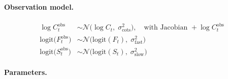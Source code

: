 \paragraph{Observation model.}
\begin{align}
\log C^{\text{obs}}_t &\sim \mathcal{N}\!\big(\log C_t,\; \sigma_{\text{cots}}^2\big), \quad \text{with Jacobian } +\log C^{\text{obs}}_t \\
\mathrm{logit}\big(F^{\text{obs}}_t\big) &\sim \mathcal{N}\!\big(\mathrm{logit}(F_t),\; \sigma_{\text{fast}}^2\big) \\
\mathrm{logit}\big(S^{\text{obs}}_t\big) &\sim \mathcal{N}\!\big(\mathrm{logit}(S_t),\; \sigma_{\text{slow}}^2\big)
\end{align}

\paragraph{Parameters.}
